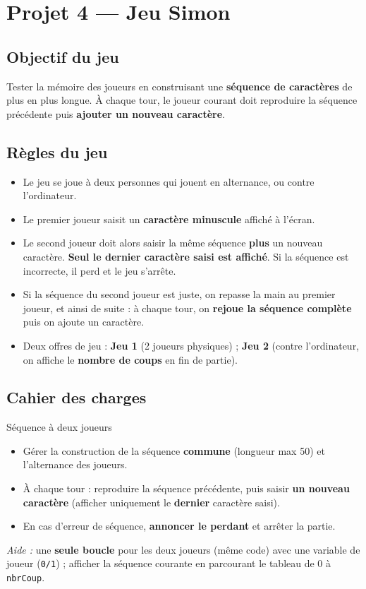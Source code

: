\section{Projet 4 — Jeu Simon}

\subsection*{Objectif du jeu}
Tester la mémoire des joueurs en construisant une \textbf{séquence de caractères} de plus en plus longue. À chaque tour, le joueur courant doit reproduire la séquence précédente puis \textbf{ajouter un nouveau caractère}.

\subsection*{Règles du jeu}
\begin{itemize}
  \item Le jeu se joue à deux personnes qui jouent en alternance, ou contre l’ordinateur.
  \item Le premier joueur saisit un \textbf{caractère minuscule} affiché à l’écran.
  \item Le second joueur doit alors saisir la même séquence \textbf{plus} un nouveau caractère. \textbf{Seul le dernier caractère saisi est affiché}. Si la séquence est incorrecte, il perd et le jeu s’arrête.
  \item Si la séquence du second joueur est juste, on repasse la main au premier joueur, et ainsi de suite : à chaque tour, on \textbf{rejoue la séquence complète} puis on ajoute un caractère.
  \item Deux offres de jeu : \textbf{Jeu 1} (2 joueurs physiques) ; \textbf{Jeu 2} (contre l’ordinateur, on affiche le \textbf{nombre de coups} en fin de partie).
\end{itemize}

\subsection*{Cahier des charges}
\begin{UPSTICahierDesCharges}{Séquence à deux joueurs}
\begin{itemize}
  \item Gérer la construction de la séquence \textbf{commune} (longueur max 50) et l’alternance des joueurs.
  \item À chaque tour : reproduire la séquence précédente, puis saisir \textbf{un nouveau caractère} (afficher uniquement le \textbf{dernier} caractère saisi).
  \item En cas d’erreur de séquence, \textbf{annoncer le perdant} et arrêter la partie.
\end{itemize}
\textit{Aide :} une \textbf{seule boucle} pour les deux joueurs (même code) avec une variable de joueur (\texttt{0/1}) ; afficher la séquence courante en parcourant le tableau de 0 à \texttt{nbrCoup}.
\end{UPSTICahierDesCharges}


